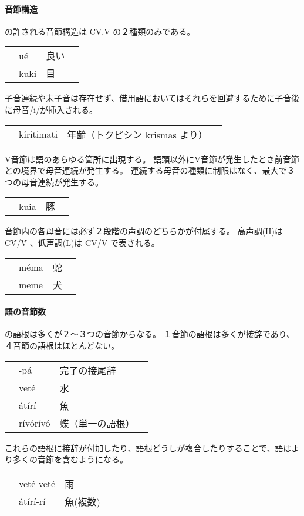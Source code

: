 \paragraph{音節構造}
\langname の許される音節構造は CV,V の２種類のみである。

\begin{tabular}{llll}
    & u\'e & 良い \\
    & kuki & 目 \\
\end{tabular}

子音連続や末子音は存在せず、借用語においてはそれらを回避するために子音後に母音/i/が挿入される。

\begin{tabular}{llll}
    & k\'iritimati & 年齢（トクピシン krismas より） \\
\end{tabular}

V音節は語のあらゆる箇所に出現する。
語頭以外にV音節が発生したとき前音節との境界で母音連続が発生する。
連続する母音の種類に制限はなく、最大で３つの母音連続が発生する。

\begin{tabular}{llll}
    & kuia & 豚 \\
\end{tabular}

音節内の各母音には必ず２段階の声調のどちらかが付属する。
高声調(H)は C\'V/\'V 、低声調(L)は CV/V で表される。

\begin{tabular}{llll}
    & m\'ema & 蛇 \\
    & meme & 犬 \\
\end{tabular}

\paragraph{語の音節数}
\langname の語根は多くが２～３つの音節からなる。
１音節の語根は多くが接辞であり、４音節の語根はほとんどない。

\begin{tabular}{llll}
    & -p\'a & 完了の接尾辞 \\
    & vet\'e & 水 \\
    & \'at\'ir\'i & 魚 \\
    & r\'iv\'or\'iv\'o & 蝶（単一の語根） \\
\end{tabular}

これらの語根に接辞が付加したり、語根どうしが複合したりすることで、語はより多くの音節を含むようになる。

\begin{tabular}{llll}
    & vet\'e-vet\'e & 雨 \\
    & \'at\'ir\'i-r\'i & 魚(複数) \\
\end{tabular}